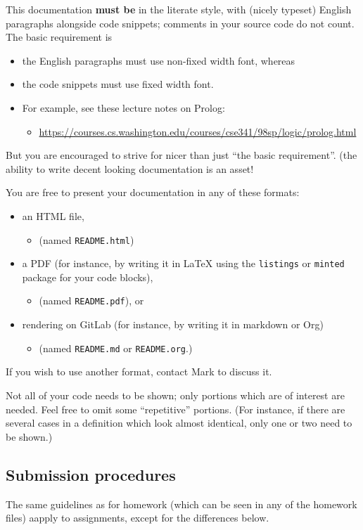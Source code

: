 \documentclass[11pt]{article}
\begin{document}
This documentation \textbf{must be} in the literate style,
with (nicely typeset) English paragraphs alongside code snippets;
comments in your source code do not count.
The basic requirement is
\begin{itemize}
\item the English paragraphs must use non-fixed width font, whereas
\item the code snippets must use fixed width font.
\item For example, see these lecture notes on Prolog:
\begin{itemize}
\item \url{https://courses.cs.washington.edu/courses/cse341/98sp/logic/prolog.html}
\end{itemize}
\end{itemize}
But you are encouraged to strive for nicer than just
“the basic requirement”.
(the ability to write decent looking documentation is an asset!

You are free to present your documentation in any of these formats:
\begin{itemize}
\item an HTML file,
\begin{itemize}
\item (named \texttt{README.html})
\end{itemize}
\item a PDF (for instance, by writing it in \LaTeX{} using
the \texttt{listings} or \texttt{minted} package for your code blocks),
\begin{itemize}
\item (named \texttt{README.pdf}), or
\end{itemize}
\item rendering on GitLab (for instance, by writing it in markdown or Org)
\begin{itemize}
\item (named \texttt{README.md} or \texttt{README.org}.)
\end{itemize}
\end{itemize}
If you wish to use another format, contact Mark to discuss it.

Not all of your code needs to be shown;
only portions which are of interest are needed.
Feel free to omit some “repetitive” portions.
(For instance, if there are several cases in a definition
which look almost identical, only one or two need to be shown.)

\subsection*{Submission procedures}
\label{sec:orgb4da9a1}
The same guidelines as for homework
(which can be seen in any of the homework files)
aapply to assignments, except for the differences below.
\end{document}
